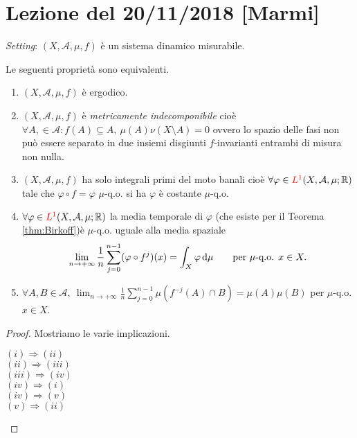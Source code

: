 \section{Lezione del 20/11/2018 [Marmi]}

\emph{Setting}: $ (X, \mathcal{A}, \mu, f) $ è un sistema dinamico misurabile.

\begin{thm}
    Le seguenti proprietà sono equivalenti.
    \begin{enumerate}[label=(\roman*)]
        \item $ (X, \mathcal{A}, \mu, f) $ è ergodico.
        \item $ (X, \mathcal{A}, \mu, f) $ è \emph{metricamente indecomponibile} cioè $ \forall A, \in \mathcal{A} : f(A) \subseteq A, \ \mu(A) \nu(X \setminus A) = 0 $ ovvero lo spazio delle fasi non può essere separato in due insiemi disgiunti $ f $-invarianti entrambi di misura non nulla. 
        \item $ (X, \mathcal{A}, \mu, f) $ ha solo integrali primi del moto banali cioè $ \forall \varphi \in \textcolor{red}{L^1}(X, \mathcal{A}, \mu; \mathbb{R}) $ tale che $ \varphi \circ f = \varphi $ $ \mu $-q.o. si ha $ \varphi $ è costante $ \mu $-q.o.
        \item $ \forall \varphi \in \textcolor{red}{L^1}(X, \mathcal{A}, \mu; \mathbb{R}) $ la media temporale di $ \varphi $ (che esiste per il Teorema \ref{thm:Birkoff})è $ \mu $-q.o. uguale alla media spaziale 
        \[
            \lim_{n \to +\infty} \frac{1}{n} \sum_{j=0}^{n-1} (\varphi \circ f^j)(x) = \int_{X} \varphi \dif{\mu} \qquad \text{per } \mu\text{-q.o. } x \in X.
        \]
        \item $ \forall A, B \in \mathcal{A}, \ \displaystyle{\lim_{n \to +\infty} \frac{1}{n} \sum_{j=0}^{n-1} \mu(f^{-j}(A) \cap B) = \mu(A) \mu(B)} $ per $ \mu $-q.o. $ x \in X $. 
    \end{enumerate}
\end{thm}
\begin{proof}
    Mostriamo le varie implicazioni.
    \begin{description}
        \item[$ (i) \Rightarrow (ii) $] 
        \item[$ (ii) \Rightarrow (iii) $] 
        \item[$ (iii) \Rightarrow (iv) $] 
        \item[$ (iv) \Rightarrow (i) $] 
        \item[$ (iv) \Rightarrow (v) $] 
        \item[$ (v) \Rightarrow (ii) $] 
    \end{description}
\end{proof}


